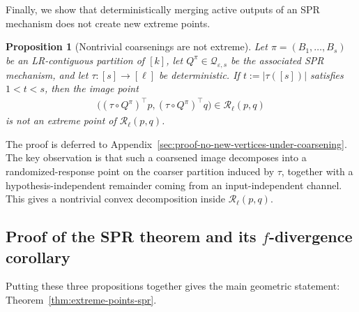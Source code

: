 \documentclass{article}
\theoremstyle{plain}
\newtheorem{proposition}[theorem]{Proposition}
\theoremstyle{definition}
\theoremstyle{plain}
\newcommand{\eps}{\varepsilon}
\begin{document}
Finally, we show that deterministically merging active outputs of an SPR mechanism does not create new extreme points.

\begin{proposition}[Nontrivial coarsenings are not extreme]
\label{prop:no-new-vertices-under-coarsening}
Let $\pi=(B_1,\dots,B_s)$ be an LR-contiguous partition of $[k]$, let $Q^\pi\in\mathcal Q_{\eps,s}$ be the associated SPR mechanism, and let $\tau:[s]\to[\ell]$ be deterministic. If $t:=|\tau([s])|$ satisfies $1<t<s$, then the image point
\begin{align}
    \bigl((\tau\circ Q^\pi)^\top p,(\tau\circ Q^\pi)^\top q\bigr)\in\mathcal R_\ell(p,q)
\end{align}
is not an extreme point of $\mathcal R_\ell(p,q)$.
\end{proposition}

The proof is deferred to Appendix~\ref{sec:proof-no-new-vertices-under-coarsening}. The key observation is that such a coarsened image decomposes into a randomized-response point on the coarser partition induced by $\tau$, together with a hypothesis-independent remainder coming from an input-independent channel. This gives a nontrivial convex decomposition inside $\mathcal R_\ell(p,q)$.

\subsection{Proof of the SPR theorem and its \texorpdfstring{$f$-divergence}{f-divergence} corollary}
\label{sec:geom-proof}

Putting these three propositions together gives the main geometric statement: Theorem~\ref{thm:extreme-points-spr}.
\end{document}
